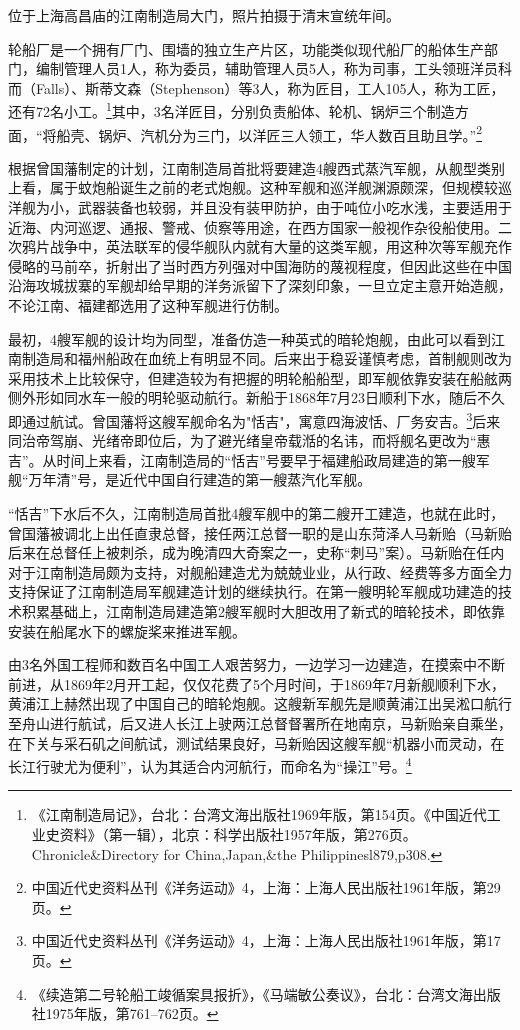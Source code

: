 \documentclass[12pt,UTF8]{ctexbook}
\begin{document}
位于上海高昌庙的江南制造局大门，照片拍摄于清末宣统年间。

轮船厂是一个拥有厂门、围墙的独立生产片区，功能类似现代船厂的船体生产部门，编制管理人员1人，称为委员，辅助管理人员5人，称为司事，工头领班洋员科而（Falls）、斯蒂文森（Stephenson）等3人，称为匠目，工人105人，称为工匠，还有72名小工。\footnote{《江南制造局记》，台北：台湾文海出版社1969年版，第154页。《中国近代工业史资料》（第一辑），北京：科学出版社1957年版，第276页。Chronicle\&Directory for China,Japan,\&the Philippinesl879,p308.}其中，3名洋匠目，分别负责船体、轮机、锅炉三个制造方面，“将船壳、锅炉、汽机分为三门，以洋匠三人领工，华人数百且助且学。”\footnote{中国近代史资料丛刊《洋务运动》4，上海：上海人民出版社1961年版，第29页。}

根据曾国藩制定的计划，江南制造局首批将要建造4艘西式蒸汽军舰，从舰型类别上看，属于蚊炮船诞生之前的老式炮舰。这种军舰和巡洋舰渊源颇深，但规模较巡洋舰为小，武器装备也较弱，并且没有装甲防护，由于吨位小吃水浅，主要适用于近海、内河巡逻、通报、警戒、侦察等用途，在西方国家一般视作杂役船使用。二次鸦片战争中，英法联军的侵华舰队内就有大量的这类军舰，用这种次等军舰充作侵略的马前卒，折射出了当时西方列强对中国海防的蔑视程度，但因此这些在中国沿海攻城拔寨的军舰却给早期的洋务派留下了深刻印象，一旦立定主意开始造舰，不论江南、福建都选用了这种军舰进行仿制。

最初，4艘军舰的设计均为同型，准备仿造一种英式的暗轮炮舰，由此可以看到江南制造局和福州船政在血统上有明显不同。后来出于稳妥谨慎考虑，首制舰则改为采用技术上比较保守，但建造较为有把握的明轮船船型，即军舰依靠安装在船舷两侧外形如同水车一般的明轮驱动航行。新船于1868年7月23日顺利下水，随后不久即通过航试。曾国藩将这艘军舰命名为"恬吉"，寓意四海波恬、厂务安吉。\footnote{中国近代史资料丛刊《洋务运动》4，上海：上海人民出版社1961年版，第17页。}后来同治帝驾崩、光绪帝即位后，为了避光绪皇帝载湉的名讳，而将舰名更改为“惠吉”。从时间上来看，江南制造局的“恬吉”号要早于福建船政局建造的第一艘军舰“万年清”号，是近代中国自行建造的第一艘蒸汽化军舰。

“恬吉”下水后不久，江南制造局首批4艘军舰中的第二艘开工建造，也就在此时，曾国藩被调北上出任直隶总督，接任两江总督一职的是山东菏泽人马新贻（马新贻后来在总督任上被刺杀，成为晚清四大奇案之一，史称“刺马”案）。马新贻在任内对于江南制造局颇为支持，对舰船建造尤为兢兢业业，从行政、经费等多方面全力支持保证了江南制造局军舰建造计划的继续执行。在第一艘明轮军舰成功建造的技术积累基础上，江南制造局建造第2艘军舰时大胆改用了新式的暗轮技术，即依靠安装在船尾水下的螺旋桨来推进军舰。

由3名外国工程师和数百名中国工人艰苦努力，一边学习一边建造，在摸索中不断前进，从1869年2月开工起，仅仅花费了5个月时间，于1869年7月新舰顺利下水，黄浦江上赫然出现了中国自己的暗轮炮舰。这艘新军舰先是顺黄浦江出吴淞口航行至舟山进行航试，后又进人长江上驶两江总督督署所在地南京，马新贻亲自乘坐，在下关与采石矶之间航试，测试结果良好，马新贻因这艘军舰“机器小而灵动，在长江行驶尤为便利”，认为其适合内河航行，而命名为“操江”号。\footnote{《续造第二号轮船工竣循案具报折》，《马端敏公奏议》，台北：台湾文海出版社1975年版，第761--762页。}
\end{document}
